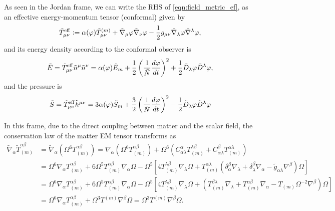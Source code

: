 As seen in the Jordan frame, we can write the RHS of \cref{eqn:field_metric_ef}, as an effective energy-momentum tensor (conformal) given by
\begin{equation}
    \Tilde{T}^{\mathrm{eff}}_{\mu\nu}:=\alpha(\varphi)\Tilde{T}_{\mu\nu}^{(m)} + \Tilde{\nabla}_\mu\varphi\Tilde{\nabla}_\nu\varphi-\frac{1}{2}g_{\mu\nu}\Tilde{\nabla}_\lambda\varphi\Tilde{\nabla}^\lambda\varphi,
\end{equation}
and its energy density according to the conformal observer is
\begin{equation}
    \Tilde{E}=\Tilde{T}^{\mathrm{eff}}_{\mu\nu}\Tilde{n}^\mu\Tilde{n}^\nu =\alpha(\varphi)\Tilde{E}_m+\frac{1}{2}\left(\frac{1}{\Tilde{N}}\frac{d\varphi}{dt}\right)^2+\frac{1}{2}\Tilde{D}_\lambda\varphi\Tilde{D}^\lambda\varphi,
    \label{eqn:energy_density_ef}
\end{equation}
and the pressure is
\begin{equation}
\Tilde{S}=\Tilde{T}^{\mathrm{eff}}_{\mu\nu}\Tilde{h}^{\mu\nu}=3\alpha(\varphi)\Tilde{S}_m+\frac{3}{2}\left(\frac{1}{\Tilde{N}}\frac{d\varphi}{dt}\right)^2-\frac{1}{2}\Tilde{D}_\lambda\varphi\Tilde{D}^\lambda\varphi
    \label{eqn:pressure_ef}
\end{equation}



In this frame, due to the direct coupling between matter and the scalar field, the conservation law of the matter EM tensor transforms as
\begin{align}
    \tilde{\nabla}_\alpha\tilde{T}^{\alpha\beta}_{(m)}&=\tilde{\nabla}_\alpha\left(\Omega^{6} T_{(m)}^{\alpha\beta}\right)=\nabla_\alpha\left(\Omega^{6} T_{(m)}^{\alpha\beta}\right)+\Omega^6\left(C^\alpha_{\alpha\lambda}T_{(m)}^{\lambda\beta}+C^\beta_{\alpha\lambda}T_{(m)}^{\alpha\lambda}\right)\nonumber\\
    &=\Omega^6 \nabla_\alpha T_{(m)}^{\alpha\beta}+6 \Omega^{5} T_{(m)}^{\alpha\beta} \nabla_\alpha \Omega-\Omega^5\left[4T_{(m)}^{\lambda\beta} \nabla_\lambda \Omega + T_{(m)}^{\alpha\lambda}\left(\delta^\beta_\alpha\nabla_\lambda + \delta^\beta_\lambda \nabla_\alpha- \tilde{g}_{\alpha\lambda}\nabla^\beta\right)\Omega\right] \nonumber\\
    &=\Omega^6 \nabla_\alpha T_{(m)}^{\alpha\beta}+6 \Omega^{5} T_{(m)}^{\alpha\beta} \nabla_\alpha \Omega-\Omega^5\left[4T_{(m)}^{\lambda\beta} \nabla_\lambda \Omega +\left( T_{(m)}^{\beta\lambda}\nabla_\lambda +  T_{(m)}^{\alpha\beta}\nabla_\alpha-  T_{(m)}\Omega^{-2}\nabla^\beta\right)\Omega\right]\nonumber\\
    &=\Omega^6 \nabla_\alpha T_{(m)}^{\alpha\beta}+\Omega^3 T^{(m)}\nabla^\beta\Omega=\Omega^3 T^{(m)}\nabla^\beta\Omega.
    \label{eqn:conserv_law_conf_1}
\end{align}


